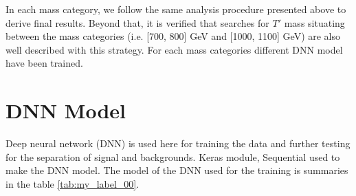 In each mass category, we follow the same analysis procedure presented above to derive final results. Beyond that, it is verified that searches for $T'$  mass situating between the mass categories (i.e. [700, 800] GeV and [1000, 1100] GeV) are also well described with this strategy. For each mass categories different DNN model have been trained.



















\section{DNN Model}
Deep neural network (DNN) is used here for training the data and further testing for the separation of signal and backgrounds. Keras module\cite{ml_1807}, Sequential\cite{ml_2}\cite{ml_3} used to make the DNN model. The model of the DNN used for the training is summaries in the table \autoref{tab:my_label_00}. 

